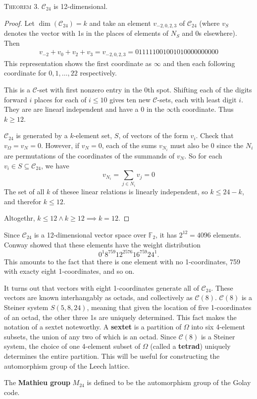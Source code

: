 \documentclass{article}
\newcommand{\C}{\mathcal{C}}
\newcommand{\F}{\mathbb{F}}
\newcommand{\sse}{\subseteq}
\newcommand{\header}[1]{\noindent\textsc{#1.} }
\begin{document}
\header{Theorem 3}
$\C_{24}$ is 12-dimensional.
\begin{proof}
Let $\dim(\C_{24}) = k$ and take an element $v_{-2, 0, 2, 3}$ of $\C_{24}$ (where $v_S$ denotes the vector with 1s in the places of elements of $N_S$ and 0s elsewhere).
Then
\begin{align*}
  v_{-2} + v_0 + v_2 + v_3 = v_{-2, 0, 2, 3} = 011111001001010000000000
\end{align*}
This representation shows the first coordinate as $\infty$ and then each following coordinate for $0, 1, \dots, 22$ respectively.

This is a $\C$-set with first nonzero entry in the 0th spot.
Shifting each of the digits forward $i$ places for each of $i \leq 10$ gives ten new $\C$-sets, each with least digit $i$.
They are are linearl independent and have a $0$ in the $\infty$th coordinate.
Thus $k \geq 12$.

$\C_{24}$ is generated by a $k$-element set, $S$, of vectors of the form $v_i$.
Check that $v_\Omega = v_N = 0$.
However, if $v_N = 0$, each of the sums $v_{N_i}$ must also be 0 since the $N_i$ are permutations of the coordinates of the summands of $v_N$. So for each $v_i \in S \sse \C_{24}$, we have
$$ v_{N_i} = \sum_{j \in N_i} v_j = 0 $$
The set of all $k$ of thesee linear relations is linearly independent, so $k \leq 24 - k$, and therefor $k \leq 12$.

Altogethr, $k \leq 12 \land k \geq 12 \implies k = 12$.
\end{proof}

Since $\C_{24}$ is a 12-dimensional vector space over $\F_{2}$, it has $2^{12} = 4096$ elements.
Conway showed that these elements have the weight distribution
$$ 0^1 8^{759} 12^{2576} 16^{759} 24^1. $$
This amounts to the fact that there is one element with no 1-coordinates, 759 with exacty eight 1-coordinates, and so on.

It turns out that vectors with eight 1-coordinates generate all of $\C_{24}$.
These vectors are known interhangably as octads, and collectively as $\C(8)$.
$\C(8)$ is a Steiner system $S(5,8,24)$, meaning that given the location of five 1-coordinates of an octad, the other three 1s are uniquely determined.
This fact makes the notation of a sextet noteworthy.
A \textbf{sextet} is a partition of $\Omega$ into six 4-element subsets, the union of any two of which is an octad.
Since $\C(8)$ is a Steiner system, the choice of one 4-element subset of $\Omega$ (called a \textbf{tetrad}) uniquely determines the entire partition.
This will be useful for constructing the automorphism group of the Leech lattice.

The \textbf{Mathieu group} $M_{24}$ is defined to be the automorphism group of the Golay code.
\end{document}
